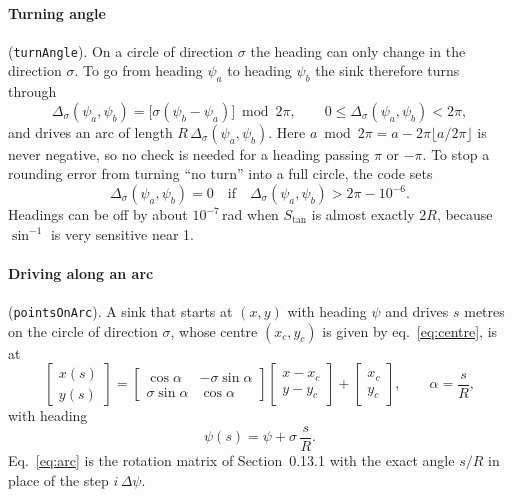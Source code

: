 \documentclass[10pt]{article}
\newcommand{\code}[1]{\texttt{#1}}
\newcommand{\Stan}{S_{\tan}}
\newcommand{\Turn}{\Delta}
\begin{document}
\paragraph{Turning angle} (\code{turnAngle}). On a circle of direction $\sigma$ the heading can only change in the
direction $\sigma$. To go from heading $\psi_a$ to heading $\psi_b$ the sink therefore turns through
\begin{equation}
  \Turn_\sigma(\psi_a, \psi_b) = \bigl[\sigma(\psi_b - \psi_a)\bigr] \bmod 2\pi, \qquad
  0 \le \Turn_\sigma(\psi_a, \psi_b) < 2\pi,
  \label{eq:turn}
\end{equation}
and drives an arc of length $R\,\Turn_\sigma(\psi_a, \psi_b)$. Here $a \bmod 2\pi = a - 2\pi \lfloor a / 2\pi \rfloor$
is never negative, so no check is needed for a heading passing $\pi$ or $-\pi$. To stop a rounding error from turning
``no turn'' into a full circle, the code sets
\begin{equation}
  \Turn_\sigma(\psi_a, \psi_b) = 0 \quad \text{if} \quad \Turn_\sigma(\psi_a, \psi_b) > 2\pi - 10^{-6}.
  \label{eq:turn-guard}
\end{equation}
Headings can be off by about $10^{-7}$\,rad when $\Stan$ is almost exactly $2R$, because $\sin^{-1}$ is very
sensitive near 1.

\paragraph{Driving along an arc} (\code{pointsOnArc}). A sink that starts at $(x, y)$ with heading $\psi$ and drives
$s$ metres on the circle of direction $\sigma$, whose centre $(x_c, y_c)$ is given by eq.~\eqref{eq:centre}, is at
\begin{equation}
  \begin{bmatrix} x(s) \\ y(s) \end{bmatrix} =
  \begin{bmatrix} \cos\alpha & -\sigma\sin\alpha \\ \sigma\sin\alpha & \cos\alpha \end{bmatrix}
  \begin{bmatrix} x - x_c \\ y - y_c \end{bmatrix} +
  \begin{bmatrix} x_c \\ y_c \end{bmatrix},
  \qquad \alpha = \frac{s}{R},
  \label{eq:arc}
\end{equation}
with heading
\begin{equation}
  \psi(s) = \psi + \sigma\,\frac{s}{R}.
  \label{eq:arc-heading}
\end{equation}
Eq.~\eqref{eq:arc} is the rotation matrix of Section~0.13.1 with the exact angle $s/R$ in place of the step
$i\,\Delta\psi$.
\end{document}
